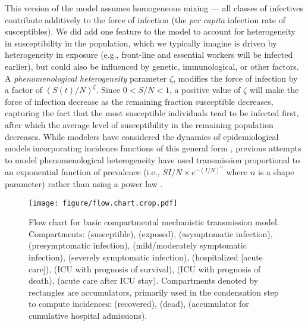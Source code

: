 \documentclass[12pt]{article}\usepackage[]{graphicx}\usepackage[]{color}
\begin{document}
This version of the model assumes homogeneous mixing --- all classes of infectives contribute additively to the force of infection (the \emph{per capita} infection rate of susceptibles).
We did add one feature to the model to account for heterogeneity in susceptibility in the population, which we typically imagine is driven by heterogeneity in exposure (e.g., front-line and essential workers will be infected earlier), but could also be influenced by genetic, immunological, or other factors.
A \emph{phenomenological heterogeneity} parameter  $\zeta$, modifies the force of infection by a factor of $\left(S(t)/N\right)^\zeta$. Since $0 < S/N < 1$, a positive value of $\zeta$ will make the force of infection decrease as the remaining fraction susceptible decreases, capturing the fact that the most susceptible individuals tend to be infected first, after which
the average level of susceptibility in the remaining population decreases. While modelers have considered the dynamics of epidemiological models incorporating incidence functions of this general form \cite{WilsWorc+45,Liu+87}, previous attempts to model phenomenological heterogeneity have used transmission proportional to an exponential function of prevalence (i.e., $S I/N \times e^{-(I/N)^n}$ where $n$ is a shape parameter) rather than using a power law \cite{Will+06,Gran+09}. 

\begin{figure}
\texttt{[image: figure/flow.chart.crop.pdf]}
\caption{Flow chart for basic compartmental mechanistic transmission model. 
Compartments:  (susceptible),  (exposed),  (asymptomatic infection),  (presymptomatic infection),  (mild/moderately symptomatic infection),  (severely symptomatic infection),  (hospitalized [acute care]),  (ICU with prognosis of survival),  (ICU with prognosis of death),  (acute care after ICU stay). 
Compartments denoted by rectangles are accumulators, primarily used in the condensation step to compute incidences:  (recovered),  (dead),  (accumulator for cumulative hospital admissions).
}
\label{fig:flowchart}
\end{figure}
\end{document}
